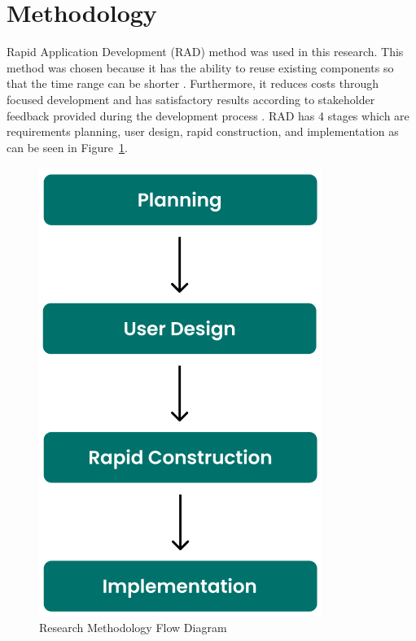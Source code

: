 \documentclass[conference,a4paper]{IEEEtran}
\begin{document}
\section{Methodology}
\label{sect:methodology}

Rapid Application Development (RAD) method was used in this research. This method was chosen because it has the ability to reuse existing components so that the time range can be shorter \cite{b7}. Furthermore, it reduces costs through focused development and has satisfactory results according to stakeholder feedback provided during the development process \cite{b8}. RAD has 4 stages which are requirements planning, user design, rapid construction, and implementation as can be seen in Figure~\ref{method}.

\begin{figure}[htb]
  \centering
  \includegraphics [width=3 cm, height=5 cm]{images/method}
  \caption{Research Methodology Flow Diagram}
  \label{method}
\end{figure}
\end{document}
